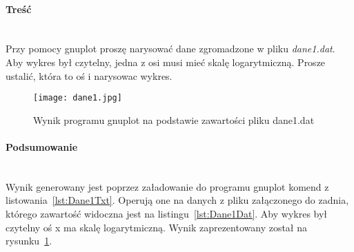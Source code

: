 \paragraph{Treść}~\\
Przy pomocy gnuplot proszę narysować dane zgromadzone w pliku \textit{dane1.dat}.
Aby wykres był czytelny, jedna z osi musi mieć skalę logarytmiczną.
Prosze ustalić, która to oś i narysowac wykres.





\begin{figure}[h]
  \caption{Wynik programu gnuplot na podstawie zawartości pliku dane1.dat}
  \label{fig:Dane1Jpg}
  \centering
  \texttt{[image: dane1.jpg]}
\end{figure}

\paragraph{Podsumowanie}~\\
Wynik generowany jest poprzez załadowanie do programu gnuplot komend z listowania~\ref{lst:Dane1Txt}.
Operują one na danych z pliku załączonego do zadnia, którego zawartość widoczna jest na listingu~\ref{lst:Dane1Dat}.
Aby wykres był czytelny oś x ma skalę logarytmiczną.
Wynik zaprezentowany został na rysunku~\ref{fig:Dane1Jpg}.
